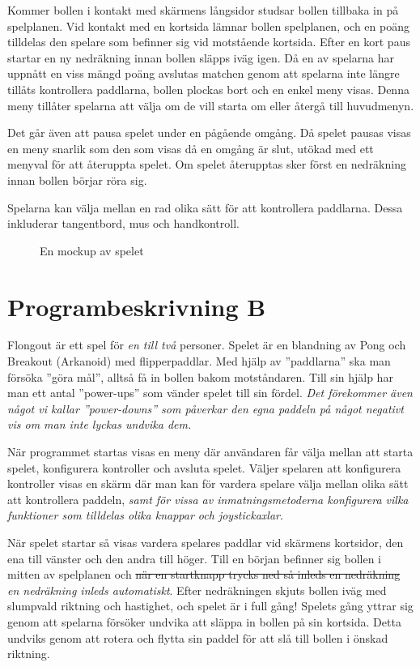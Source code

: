 \documentclass[a4paper,11pt]{article}
\begin{document}
\bigskip
\noindent
Kommer bollen i kontakt med skärmens långsidor studsar bollen tillbaka in på spelplanen. Vid kontakt med
en kortsida lämnar bollen spelplanen, och en poäng tilldelas den spelare som befinner sig vid
motstående kortsida. Efter en kort paus startar en ny nedräkning innan bollen släpps iväg igen. Då en av spelarna har uppnått en viss mängd poäng avslutas matchen genom att
spelarna inte längre tillåts kontrollera paddlarna, bollen plockas bort och en enkel meny visas.
Denna meny tillåter spelarna att välja om de vill starta om eller återgå till huvudmenyn.

\bigskip
\noindent
Det går även att pausa spelet under en pågående omgång. Då spelet pausas visas en meny
snarlik som den som visas då en omgång är slut, utökad med ett menyval för att återuppta spelet.
Om spelet återupptas sker först en nedräkning innan bollen börjar röra sig.

\bigskip
\noindent
Spelarna kan välja mellan en rad olika sätt för att kontrollera paddlarna. Dessa inkluderar
tangentbord, mus och handkontroll.

\begin{figure}[H]
\centering
\caption{En mockup av spelet}
\end{figure}

\section{Programbeskrivning B}
Flongout är ett spel för \textit{en till två} personer. Spelet är en blandning av Pong och Breakout
(Arkanoid) med flipperpaddlar. Med hjälp av ''paddlarna'' ska man försöka ''göra mål'', alltså få
in bollen bakom motståndaren. Till sin hjälp har man ett antal ''power-ups'' som vänder spelet till
sin fördel. \textit{Det förekommer även något vi kallar ''power-downs'' som påverkar den egna paddeln
på något negativt vis om man inte lyckas undvika dem.}

\bigskip
\noindent 
När programmet startas visas en meny där användaren får välja mellan att starta spelet, konfigurera
kontroller och avsluta spelet. Väljer spelaren att konfigurera kontroller visas en skärm där man kan
för vardera spelare välja mellan olika sätt att kontrollera paddeln, \textit{samt för vissa av
inmatningsmetoderna konfigurera vilka funktioner som tilldelas olika knappar och joystickaxlar}.

\bigskip
\noindent
När spelet startar så visas vardera spelares paddlar vid skärmens kortsidor, den ena till vänster
och den andra till höger. Till en början befinner sig bollen i mitten av spelplanen och \sout{när en
startknapp trycks ned så inleds en nedräkning} \textit{en nedräkning inleds automatiskt}. Efter
nedräkningen skjuts bollen iväg med slumpvald riktning och hastighet, och spelet är i full gång!
Spelets gång yttrar sig genom att spelarna försöker undvika att släppa in bollen på sin kortsida.
Detta undviks genom att rotera och flytta sin paddel för att slå till bollen i önskad riktning.
\end{document}
